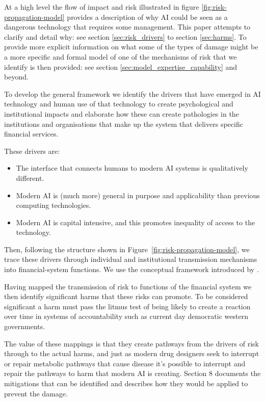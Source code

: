 \documentclass[11pt]{article}
\begin{document}
At a high level the flow of impact and risk illustrated in figure \ref{fig:risk-propagation-model} provides a description of why AI could be seen as a dangerous technology that requires some management. This paper attempts to clarify and detail why: see section \ref{sec:risk_drivers} to section \ref{sec:harms}. To provide more explicit information on what some of the types of damage might be a more specific and formal model of one of the mechanisms of risk that we identify is then provided: see section \ref{sec:model_expertise_capability} and beyond. 

To develop the general framework we identify the drivers that have emerged in AI technology and human use of that technology to create psychological and institutional impacts and elaborate how these can create pathologies in the institutions and organisations that make up the system that delivers specific financial services. 

These drivers are: 
\begin{itemize}
\item The interface that connects humans to modern AI systems is qualitatively different. 
\item Modern AI is (much more) general in purpose and applicability than previous computing technologies. 
\item Modern AI is capital intensive, and this promotes inequality of access to the technology. 
\end{itemize}

Then, following the structure shown in Figure~\ref{fig:risk-propagation-model}, we trace these drivers through individual and institutional transmission mechanisms into financial-system functions. We use the conceptual framework introduced by \cite{bodieConceptualFrameworkAnalyzing1998a}.

Having mapped the transmission of risk to functions of the financial system we then identify significant harms that these risks can promote. To be considered significant a harm must pass the litmus test of being likely to create a reaction over time in systems of accountability such as current day democratic western governments.  

The value of these mappings is that they create pathways from the drivers of risk through to the actual harms, and just as modern drug designers seek to interrupt or repair metabolic pathways that cause disease it's possible to interrupt and repair the pathways to harm that modern AI is creating. Section 8 documents the mitigations that can be identified and describes how they would be applied to prevent the damage. 
\end{document}

